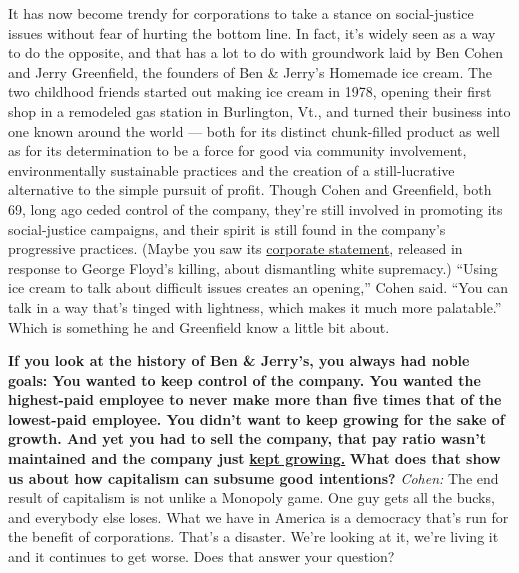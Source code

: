 It has now become trendy for corporations to take a stance on
social-justice issues without fear of hurting the bottom line. In fact,
it's widely seen as a way to do the opposite, and that has a lot to do
with groundwork laid by Ben Cohen and Jerry Greenfield, the founders of
Ben \& Jerry's Homemade ice cream. The two childhood friends started out
making ice cream in 1978, opening their first shop in a remodeled gas
station in Burlington, Vt., and turned their business into one known
around the world --- both for its distinct chunk-filled product as well
as for its determination to be a force for good via community
involvement, environmentally sustainable practices and the creation of a
still-lucrative alternative to the simple pursuit of profit. Though
Cohen and Greenfield, both 69, long ago ceded control of the company,
they're still involved in promoting its social-justice campaigns, and
their spirit is still found in the company's progressive practices.
(Maybe you saw its
\href{https://www.benjerry.com/about-us/media-center/dismantle-white-supremacy}{corporate
statement}, released in response to George Floyd's killing, about
dismantling white supremacy.) ``Using ice cream to talk about difficult
issues creates an opening,'' Cohen said. ``You can talk in a way that's
tinged with lightness, which makes it much more palatable.'' Which is
something he and Greenfield know a little bit about.

\textbf{If you look at the history of Ben \& Jerry's, you always had
noble goals: You wanted to keep control of the company. You wanted the
highest-paid employee to never make more than five times that of the
lowest-paid employee. You didn't want to keep growing for the sake of
growth. And yet you had to sell the company, that pay ratio wasn't
maintained and the company just}
\textbf{\href{http://nytimes.com\#tooltip-1}{kept growing.}}
\textbf{What does that show us about how capitalism can subsume good
intentions?} \emph{Cohen:} The end result of capitalism is not unlike a
Monopoly game. One guy gets all the bucks, and everybody else loses.
What we have in America is a democracy that's run for the benefit of
corporations. That's a disaster. We're looking at it, we're living it
and it continues to get worse. Does that answer your question?

